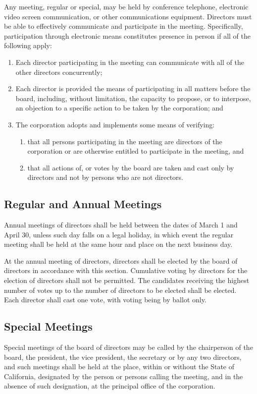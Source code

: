 \documentclass{article}
\begin{document}
	Any meeting, regular or special, may be held by conference telephone, electronic video screen communication, or other communications equipment. Directors must be able to effectively communicate and participate in the meeting. Specifically, participation through electronic means constitutes presence in person if all of the following apply:
	\begin{enumerate}[\indent (a)]
		\item Each director participating in the meeting can communicate with all of the other directors concurrently;
		\item	Each director is provided the means of participating in all matters before the board, including, without limitation, the capacity to propose, or to interpose, an objection to a specific action to be taken by the corporation; and
		\item	The corporation adopts and implements some means of verifying:
		\begin{enumerate}[\indent 1)]
			\item that all persons participating in the meeting are directors of the corporation or are otherwise entitled to participate in the meeting, and
			\item that all actions of, or votes by the board are taken and cast only by directors and not by persons who are not directors. 
		\end{enumerate}
		
	\end{enumerate}
	
	
	\subsection{Regular and Annual Meetings}
	Annual meetings of directors shall be held between the dates of March 1 and April 30, unless such day falls on a legal holiday, in which event the regular meeting shall be held at the same hour and place on the next business day. 
	
	At the annual meeting of directors, directors shall be elected by the board of directors in accordance with this section. Cumulative voting by directors for the election of directors shall not be permitted. The candidates receiving the highest number of votes up to the number of directors to be elected shall be elected. Each director shall cast one vote, with voting being by ballot only. 
	
	\subsection{Special Meetings}
	Special meetings of the board of directors may be called by the chairperson of the board, the president, the vice president, the secretary or by any two directors, and such meetings shall be held at the place, within or without the State of California, designated by the person or persons calling the meeting, and in the absence of such designation, at the principal office of the corporation.
	
\end{document}
